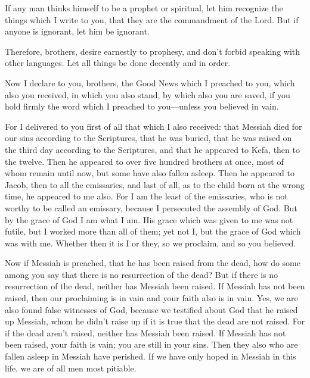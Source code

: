 \myverse{}If any man thinks himself to be a prophet or spiritual, let
him recognize the things which I write to you, that they are the commandment of the Lord.
\myverse{}But if anyone is ignorant, let him be ignorant.

\myverse{}Therefore, brothers, desire earnestly to prophesy, and don’t
forbid speaking with other languages.
\myverse{}Let all things be done decently and in order.


\mychapter{} \myverse*{}Now I declare to you, brothers, the Good News which I preached
to you, which also you received, in which you also stand,
\myverse{}by which also you are saved, if you hold firmly the word which I preached to
you—unless you believed in vain.

\myverse{}For I delivered to you first of all that which I also received:
that Messiah died for our sins according to the Scriptures,
\myverse{}that he was buried, that he was raised on the third day according to the Scriptures,
\myverse{}and that he appeared to Kefa, then to the twelve.
\myverse{}Then he appeared to over five hundred brothers at once, most of whom remain
until now, but some have also fallen asleep.
\myverse{}Then he appeared to Jacob, then to all the emissaries,
\myverse{}and last of all, as to the child born at the wrong time, he appeared to me
also.
\myverse{}For I am the least of the emissaries, who is not worthy to be called an emissary,
because I persecuted the assembly of God.
\myverse{}But by the grace of God I am what I am. His grace which was given to me was
not futile, but I worked more than all of them; yet not I, but the grace of God which was with me.
\myverse{}Whether then it is I or they, so we proclaim, and so you believed.

\myverse{}Now if Messiah is preached, that he has been raised from the
dead, how do some among you say that there is no resurrection of the dead?
\myverse{}But if there is no resurrection of the dead, neither has Messiah been raised.
\myverse{}If Messiah has not been raised, then our proclaiming is in vain and your
faith also is in vain.
\myverse{}Yes, we are also found false witnesses of God, because we testified about
God that he raised up Messiah, whom he didn’t raise up if it is true that the dead are not raised.
\myverse{}For if the dead aren’t raised, neither has Messiah been raised.
\myverse{}If Messiah has not been raised, your faith is vain; you are still in your
sins.
\myverse{}Then they also who are fallen asleep in Messiah have perished.
\myverse{}If we have only hoped in Messiah in this life, we are of all men most pitiable.


